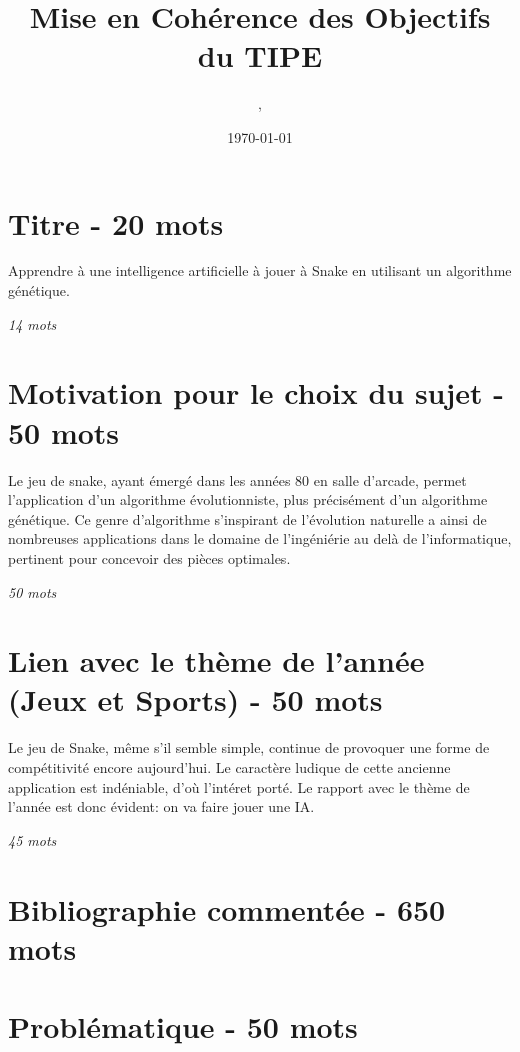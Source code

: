 \documentclass[11pt,a4paper]{article}
\author{\monNom, \maClasse}
\title{Mise en Cohérence des Objectifs du TIPE}
\date{\today}
\makeatletter
\renewcommand{\maketitle}{
  \thispagestyle{empty}
  \begin{center}
  \shadowbox{\parbox{5in}{%
     \centering%
     \textrm{\textbf{\Large \@title}}\\
     \vspace{0.2cm}
     \textrm{\large \@author}\\
     \vspace{0.2cm}
     \textrm{\large \@date}
  }} 
  \end{center}
  \null
}
\makeatother
\begin{document}
\maketitle

\tableofcontents

\thispagestyle{fancy}

\section{Titre - 20 mots}

\begin{center}
    Apprendre à une intelligence artificielle à jouer à Snake en utilisant un algorithme génétique.
\end{center}

\textit{14 mots}

\section{Motivation pour le choix du sujet - 50 mots}

Le jeu de snake, ayant émergé dans les années 80 en salle d'arcade,
permet l'application d'un algorithme évolutionniste, 
plus précisément d'un algorithme génétique.
Ce genre d'algorithme s'inspirant de l'évolution naturelle a ainsi de 
nombreuses applications dans le domaine de l'ingéniérie au delà de l'informatique, 
pertinent pour concevoir des pièces optimales.

\textit{50 mots}

\section{Lien avec le thème de l'année (Jeux et Sports) - 50 mots}

Le jeu de Snake, même s'il semble simple, continue de provoquer 
une forme de compétitivité encore aujourd'hui. 
Le caractère ludique de cette ancienne application est 
indéniable, d'où l'intéret porté.
Le rapport avec le thème de l'année est donc évident: on va
faire jouer une IA.

\textit{45 mots}

\section{Bibliographie commentée - 650 mots}

\section{Problématique - 50 mots}
\end{document}
